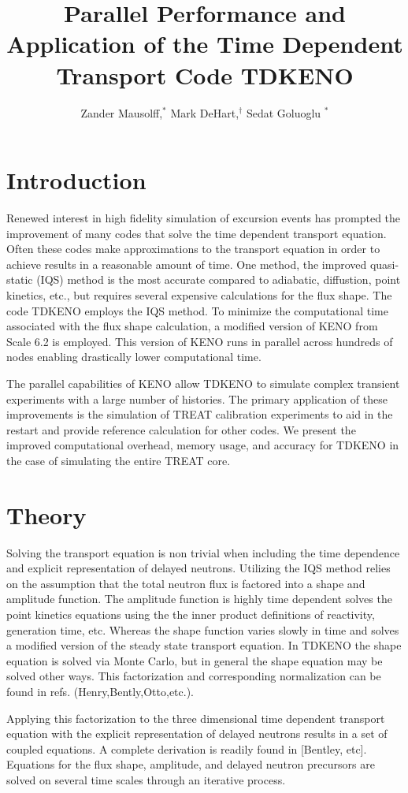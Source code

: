 \documentclass{anstrans}
\title{Parallel Performance and Application of the Time Dependent Transport Code TDKENO }
\author{Zander Mausolff,$^{*}$ Mark DeHart,$^{\dagger}$ Sedat Goluoglu $^{*}$}
\institute{
$^{*}$Nuclear Engineering Program, University of Florida
\\
529 Gale Lemerand Dr., Gainesville, FL, 32611
\and
$^{\dagger}$Nuclear Systems Design and Analysis Department Idaho National Laboratory 
\\
2525 North Freemont Street, Idaho Falls ID, 83415
}
\begin{document}
\section{Introduction}
Renewed interest in high fidelity simulation of excursion events has prompted the improvement of many codes that solve the time dependent transport equation. Often these codes make approximations to the transport equation in order to achieve results in a reasonable amount of time.  One method, the improved quasi-static (IQS) method is the most accurate compared to adiabatic, diffustion, point kinetics, etc., but requires several expensive calculations for the flux shape.  The code TDKENO employs the IQS method. To minimize the computational time associated with the flux shape calculation, a modified version of KENO from Scale 6.2 is employed. This version of KENO runs in parallel across hundreds of nodes enabling drastically lower computational time.

The parallel capabilities of KENO allow TDKENO to simulate complex transient experiments with a large number of histories. The primary application of these improvements is the simulation of TREAT calibration experiments to aid in the restart and provide reference calculation for other codes. We present the improved computational overhead, memory usage, and accuracy for TDKENO in the case of simulating the entire TREAT core. 

\section{Theory}
Solving the transport equation is non trivial when including the time dependence and explicit representation of delayed neutrons.  Utilizing the IQS method relies on the assumption that the total neutron flux is factored into a shape and amplitude function.  The amplitude function is highly time dependent solves the point kinetics equations using the  the inner product definitions of reactivity, generation time, etc.  Whereas the shape function varies slowly in time and solves a modified version of the steady state transport equation.  In TDKENO the shape equation is solved via Monte Carlo, but in general the shape equation may be solved other ways.  This factorization and corresponding normalization can be found in refs. (Henry,Bently,Otto,etc.).  

Applying this factorization to the three dimensional time dependent transport equation with the explicit representation of delayed neutrons results in a set of coupled equations. A complete derivation is readily found in [Bentley, etc].  Equations for the flux shape, amplitude, and delayed neutron precursors are solved on several time scales through an iterative process. 
\end{document}

